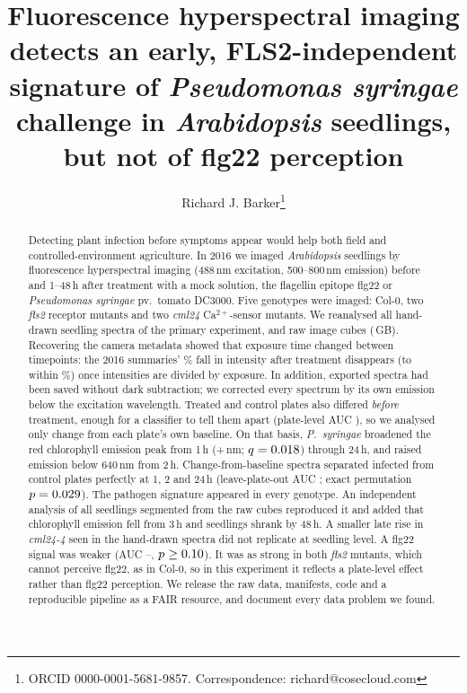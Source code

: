 \documentclass[11pt,a4paper]{article}
\title{\bfseries Fluorescence hyperspectral imaging detects an early, FLS2-independent
signature of \textit{Pseudomonas syringae} challenge in \textit{Arabidopsis} seedlings,
but not of flg22 perception}
\author[1]{Richard J. Barker\thanks{ORCID 0000-0001-5681-9857. Correspondence: richard@cosecloud.com}}
\affil[1]{Department of Botany, University of Wisconsin--Madison, USA}
\date{\pending{date}}
\begin{document}
\maketitle

\begin{abstract}
\noindent
Detecting plant infection before symptoms appear would help both field and
controlled-environment agriculture. In 2016 we imaged \textit{Arabidopsis} seedlings by
fluorescence hyperspectral imaging (488\,nm excitation, 500--800\,nm emission) before and
1--48\,h after treatment with a mock solution, the flagellin epitope flg22 or
\textit{Pseudomonas syringae} pv.\ tomato DC3000. Five genotypes were imaged: Col-0, two \textit{fls2} receptor
mutants and two \textit{cml24} Ca$^{2+}$-sensor mutants. We reanalysed all \nRoiA{} hand-drawn
seedling spectra of the primary experiment, and \nCubes{} raw image cubes (\rawGB{}\,GB).
Recovering the camera metadata showed that exposure time changed between timepoints: the
2016 summaries' \rawDropPct{}\% fall in intensity after treatment disappears (to within
\cpsDiffPct{}\%) once intensities are divided by exposure. In addition, \nOffsetRoi{} exported
spectra had been saved without dark subtraction; we corrected every spectrum by its own
emission below the excitation wavelength. Treated and control plates also
differed \emph{before} treatment, enough for a classifier to tell them apart (plate-level
AUC \aucPlaceboFlg{}), so we analysed only change from each plate's own baseline.
On that basis, \textit{P.~syringae} broadened the red chlorophyll emission peak from 1\,h
(+\pathFwhmOnenm{}\,nm; $q=0.018$) through 24\,h, and raised emission below 640\,nm from
2\,h. Change-from-baseline spectra separated infected from control plates perfectly at 1, 2 and
24\,h (leave-plate-out AUC \aucPathTwo{}; exact permutation $p=0.029$). The pathogen
signature appeared in every genotype. An independent analysis of all \nSeedA{} seedlings segmented
from the raw cubes reproduced it and added that chlorophyll emission fell from 3\,h and seedlings
shrank by 48\,h. A smaller late rise in \textit{cml24-4} seen in the hand-drawn spectra did not
replicate at seedling level. A flg22 signal was weaker
(AUC \aucFlgEarlyMin--\aucFlgEarlyMax{}, $p\geq0.10$). It was as strong in both
\textit{fls2} mutants, which cannot perceive flg22, as in Col-0, so in this experiment it
reflects a plate-level effect rather than flg22 perception. We release the raw data,
manifests, code and a reproducible pipeline as a FAIR resource, and document every data
problem we found.
\end{abstract}
\end{document}
